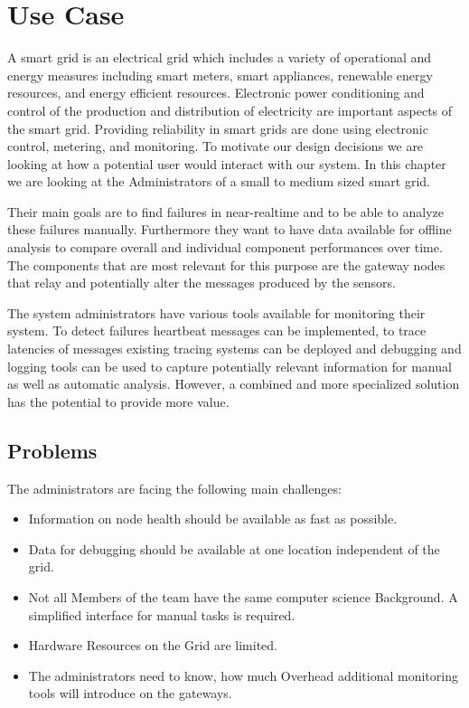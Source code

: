 \section{Use Case}

A smart grid is an electrical grid which includes a variety of operational and energy measures including smart meters, smart appliances, renewable energy resources, and energy efficient resources.
Electronic power conditioning and control of the production and distribution of electricity are important aspects of the smart grid. 
Providing reliability in smart grids are done using electronic control, metering, and monitoring. 
To motivate our design decisions we are looking at how a potential user would interact with our system. 
In this chapter we are looking at the Administrators of a small to medium sized smart grid. 

Their main goals are to find failures in near-realtime and to be able to analyze these failures manually. 
Furthermore they want to have data available for offline analysis to compare overall and individual component performances over time. 
The components that are most relevant for this purpose are the gateway nodes that relay and potentially alter the messages produced by the sensors.

\vspace{3mm}

The system administrators have various tools available for monitoring their system. 
To detect failures heartbeat messages can be implemented, to trace latencies of messages existing tracing systems can be deployed and debugging and logging tools can be used to capture potentially relevant information for manual as well as automatic analysis.
However, a combined and more specialized solution has the potential to provide more value.

\subsection{Problems}

The administrators are facing the following main challenges:

\begin{itemize}
  \item Information on node health should be available as fast as possible.
  \item Data for debugging should be available at one location independent of the grid.
  \item Not all Members of the team have the same computer science Background. A simplified interface for manual tasks is required.
  \item Hardware Resources on the Grid are limited. 
  \item The administrators need to know, how much Overhead additional monitoring tools will introduce on the gateways.
\end{itemize}

